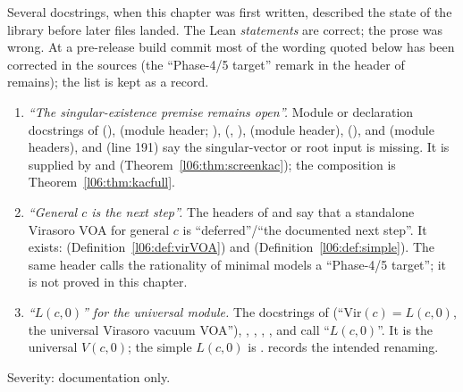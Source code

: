 \begin{warning}[title={Outdated docstrings}]\label{l06:warn:docstrings}
Several docstrings, when this chapter was first written, described the state of the
library before later files landed. The Lean \emph{statements} are correct; the prose was wrong. At a pre-release build commit
most of the wording quoted below has been corrected in the sources (the ``Phase-4/5 target'' remark in the header
of  remains); the list is kept as a record.
\begin{enumerate}
\item \emph{``The singular-existence premise remains open''.} Module or declaration docstrings of
   (\allowbreak{}\allowbreak{}\allowbreak{}\allowbreak{}),
   (module header; \allowbreak{}\allowbreak{}\allowbreak{}\allowbreak{}\allowbreak{}),
   (\allowbreak{}\allowbreak{}\allowbreak{}\allowbreak{}, \allowbreak{}\allowbreak{}\allowbreak{}\allowbreak{}),
   (module header), 
  (\allowbreak{}\allowbreak{}),  and
   (module headers), and  (line 191)
  say the singular-vector or root input is missing. It is supplied by \allowbreak{}\allowbreak{}\allowbreak{} and
  \allowbreak{}\allowbreak{}\allowbreak{} (Theorem~\ref{l06:thm:screenkac}); the composition is
  Theorem~\ref{l06:thm:kacfull}.
\item \emph{``General $c$ is the next step''.} The headers of  and
   say that a standalone Virasoro VOA for general $c$ is ``deferred''/``the
  documented next step''. It exists:  (Definition~\ref{l06:def:virVOA}) and
  \allowbreak{} (Definition~\ref{l06:def:simple}). The same header calls the rationality of
  minimal models a ``Phase-4/5 target''; it is not proved in this chapter.
\item \emph{``$L(c,0)$'' for the universal module.} The docstrings of  (``$\mathrm{Vir}(c) =
  L(c,0)$, the universal Virasoro vacuum VOA''), , ,
  , ,  and
   call  ``$L(c,0)$''. It is the universal $V(c,0)$; the simple
  $L(c,0)$ is .  records the intended renaming.
\end{enumerate}
Severity: documentation only.
\end{warning}

